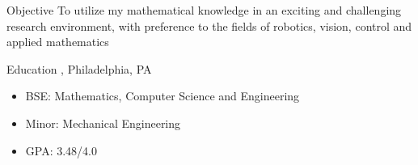 \documentclass{resume}
\author{Marc A. Millstone}
\begin{document}
\maketitle


\begin{category}{Objective}
\citemnobullet To utilize my mathematical knowledge in an exciting and challenging research environment, with  
        preference to the fields of robotics, vision, control and applied mathematics
\end{category}


\begin{category}{Education}
, Philadelphia, PA 
\begin{itemize}
\item BSE: Mathematics, Computer Science and Engineering 
\item Minor: Mechanical Engineering
\item GPA: 3.48/4.0
\end{itemize}
\end{category}

\end{document}
